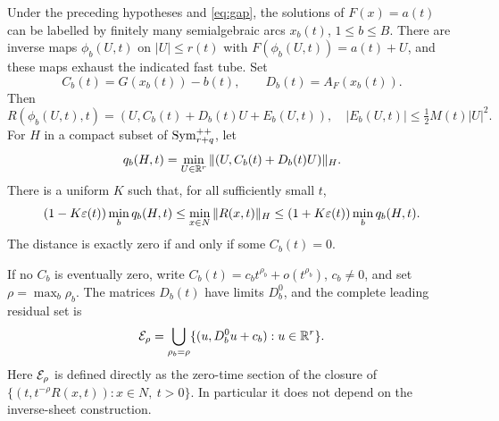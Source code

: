 \begin{theorem}\label{thm:reduction}
Under the preceding hypotheses and \eqref{eq:gap}, the solutions of $F(x)=a(t)$ can be labelled by finitely many semialgebraic arcs $x_b(t)$, $1\le b\le B$. There are inverse maps $\phi_b(U,t)$ on $|U|\le r(t)$ with $F(\phi_b(U,t))=a(t)+U$, and these maps exhaust the indicated fast tube. Set
\[
 C_b(t)=G(x_b(t))-b(t),\qquad D_b(t)=A_F(x_b(t)).
\]
Then
\begin{equation}\label{eq:derived-form}
 R(\phi_b(U,t),t)=(U,C_b(t)+D_b(t)U+E_b(U,t)),
 \quad |E_b(U,t)|\le\tfrac12 M(t)|U|^2.
\end{equation}
For $H$ in a compact subset of $\operatorname{Sym}_{r+q}^{++}$, let
\begin{equation}\label{eq:sheet-cost}
 q_b(H,t)=\min_{U\in\mathbb R^r}\|(U,C_b(t)+D_b(t)U)\|_H.
\end{equation}
There is a uniform $K$ such that, for all sufficiently small $t$,
\begin{equation}\label{eq:relative}
 (1-K\varepsilon(t))\min_b q_b(H,t)
 \le \min_{x\in N}\|R(x,t)\|_H
 \le(1+K\varepsilon(t))\min_b q_b(H,t).
\end{equation}
The distance is exactly zero if and only if some $C_b(t)=0$.

If no $C_b$ is eventually zero, write
$C_b(t)=c_b t^{\rho_b}+o(t^{\rho_b})$, $c_b\ne0$, and set
$\rho=\max_b\rho_b$. The matrices $D_b(t)$ have limits $D_b^0$, and the complete leading residual set is
\begin{equation}\label{eq:intrinsic-sheets}
 \mathcal E_\rho=\bigcup_{\rho_b=\rho}
 \{(u,D_b^0u+c_b):u\in\mathbb R^r\}.
\end{equation}
Here $\mathcal E_\rho$ is defined directly as the zero-time section of the closure of
$\{(t,t^{-\rho}R(x,t)):x\in N,\ t>0\}$. In particular it does not depend on the inverse-sheet construction.
\end{theorem}
